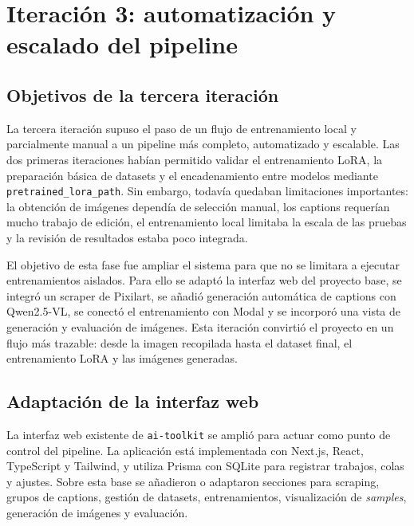\documentclass[a4paper,11pt,titlepage]{scrbook}
\begin{document}
\section{Iteración 3: automatización y escalado del pipeline}
\label{sec:iteracion_3}

\subsection{Objetivos de la tercera iteración}
\label{subsec:objetivos_iteracion_3}

La tercera iteración supuso el paso de un flujo de entrenamiento local y parcialmente manual a un pipeline más completo, automatizado y escalable. Las dos primeras iteraciones habían permitido validar el entrenamiento LoRA, la preparación básica de datasets y el encadenamiento entre modelos mediante \texttt{pretrained\_lora\_path}. Sin embargo, todavía quedaban limitaciones importantes: la obtención de imágenes dependía de selección manual, los captions requerían mucho trabajo de edición, el entrenamiento local limitaba la escala de las pruebas y la revisión de resultados estaba poco integrada.

\medskip

El objetivo de esta fase fue ampliar el sistema para que no se limitara a ejecutar entrenamientos aislados. Para ello se adaptó la interfaz web del proyecto base, se integró un scraper de Pixilart, se añadió generación automática de captions con Qwen2.5-VL, se conectó el entrenamiento con Modal y se incorporó una vista de generación y evaluación de imágenes. Esta iteración convirtió el proyecto en un flujo más trazable: desde la imagen recopilada hasta el dataset final, el entrenamiento LoRA y las imágenes generadas.

\subsection{Adaptación de la interfaz web}
\label{subsec:interfaz_iteracion_3}

La interfaz web existente de \texttt{ai-toolkit} se amplió para actuar como punto de control del pipeline. La aplicación está implementada con Next.js, React, TypeScript y Tailwind, y utiliza Prisma con SQLite para registrar trabajos, colas y ajustes. Sobre esta base se añadieron o adaptaron secciones para scraping, grupos de captions, gestión de datasets, entrenamientos, visualización de \textit{samples}, generación de imágenes y evaluación.

\medskip
\end{document}
